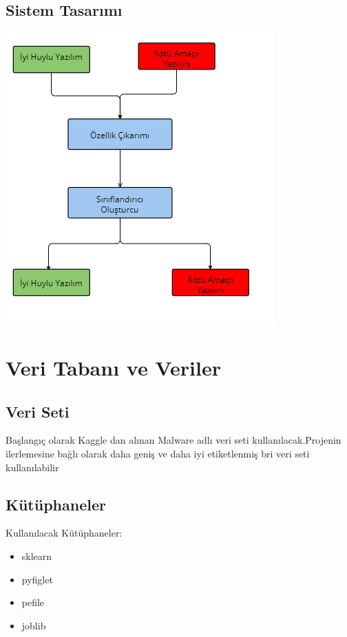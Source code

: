 \documentclass[12pt, a4paper]{article}
\begin{document}
\subsection{Sistem Tasarımı}
\includegraphics{a.jpg}

\section{Veri Tabanı ve Veriler}
\subsection{Veri Seti}
Başlangıç olarak Kaggle dan alınan Malware\cite{kaggle} adlı veri seti kullanılacak.Projenin ilerlemesine bağlı olarak daha geniş ve daha iyi etiketlenmiş bri veri seti kullanılabilir
\subsection{Kütüphaneler}
Kullanılacak Kütüphaneler:
\begin{itemize}
\item sklearn
\item pyfiglet
\item pefile
\item joblib
\end{itemize}



     


\printbibliography

	
\end{document}
